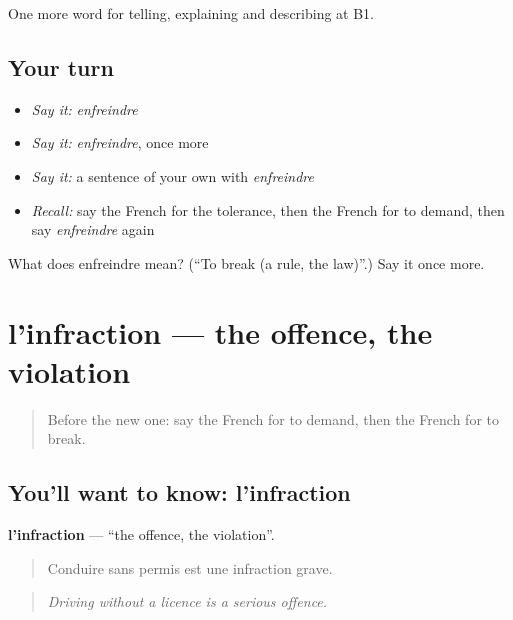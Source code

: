 \begin{grammarlens}[title={What you've built}]
One more word for telling, explaining and describing at B1.
\end{grammarlens}

\subsection*{Your turn}
\begin{itemize}
\raggedright
  \item \emph{Say it:} \emph{enfreindre}
  \item \emph{Say it:} \emph{enfreindre}, once more
  \item \emph{Say it:} a sentence of your own with \emph{enfreindre}
  \item \emph{Recall:} say the French for the tolerance, then the French for to demand, then say \emph{enfreindre} again
\end{itemize}

\begin{tcolorbox}[breakable,colback=teal!4,colframe=teal!35!black,title={Before you move on}]
What does enfreindre mean? (\textquotedblleft{}To break (a rule, the law)\textquotedblright{}.) Say it once more.
\end{tcolorbox}
\section[l'infraction]{l'infraction — the offence, the violation}

\label{lesson:FR-C382-infraction}



\begin{quote}
Before the new one: say the French for to demand, then the French for to break.
\end{quote}

\subsection*{You'll want to know: l'infraction}
\textbf{l'infraction} — \textquotedblleft{}the offence, the violation\textquotedblright{}.

\begin{quote}
Conduire sans permis est une infraction grave.
\end{quote}

\begin{quote}
\emph{Driving without a licence is a serious offence.}
\end{quote}

